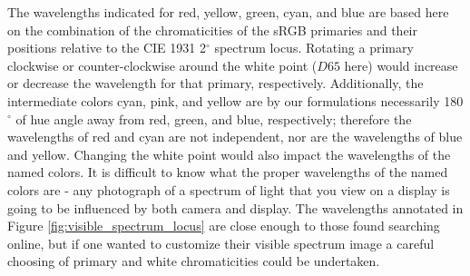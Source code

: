\documentclass{article}
\begin{document}
\begin{multicols}{2}
The wavelengths indicated for red, yellow, green, cyan, and blue are based here on the combination of the chromaticities of the sRGB primaries and their positions relative to the CIE 1931 2$^\circ$ spectrum locus.  Rotating a primary clockwise or counter-clockwise around the white point ($D65$ here) would increase or decrease the wavelength for that primary, respectively.  Additionally, the intermediate colors cyan, pink, and yellow are by our formulations necessarily 180$^\circ$ of hue angle away from red, green, and blue, respectively; therefore the wavelengths of red and cyan are not independent, nor are the wavelengths of blue and yellow.  Changing the white point would also impact the wavelengths of the named colors.  It is difficult to know what the proper wavelengths of the named colors are - any photograph of a spectrum of light that you view on a display is going to be influenced by both camera and display.  The wavelengths annotated in Figure \ref{fig:visible_spectrum_locus} are close enough to those found searching online, but if one wanted to customize their visible spectrum image a careful choosing of primary and white chromaticities could be undertaken.


\end{multicols}
\end{document}
